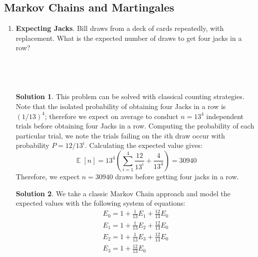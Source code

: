 \documentclass{article}
\DeclareMathOperator{\EX}{\mathbb{E}}%
\begin{document}
\subsection{Markov Chains and Martingales}
\begin{enumerate}
    \item \textbf{Expecting Jacks}. Bill draws from a deck of cards repeatedly, with replacement. What is the expected number of draws to get four jacks in a row?
    \\
    \\
    \\
    \\
    \\
    \textbf{Solution 1}. This problem can be solved with classical counting strategies. Note that the isolated probability of obtaining four Jacks in a row is $(1/13)^4$; therefore we expect on average to conduct \(n = 13^4\) independent trials before obtaining four Jacks in a row. Computing the probability of each particular trial, we note the trials failing on the $i$th draw occur with probability $P = 12/13^i$. Calculating the expected value gives:
    \begin{equation}
        \EX[n] = 13^4(\sum_{i=1}^{4} \frac{12}{13^i} + \frac{4}{13^4}) = 30940
    \end{equation}
    Therefore, we expect $\boxed{n = 30940}$ draws before getting four jacks in a row.

    \textbf{Solution 2}. We take a classic Markov Chain approach and model the expected values with the following system of equations:
    \begin{align*}
            E_0 = 1 + \frac{1}{13}E_1 + \frac{12}{13}E_0 \\
            E_1 = 1 + \frac{1}{13}E_2 + \frac{12}{13}E_0 \\
            E_2 = 1 + \frac{1}{13}E_3 + \frac{12}{13}E_0 \\
            E_3 = 1 + \frac{12}{13}E_0
    \end{align*}
    

\end{enumerate}
\end{document}
